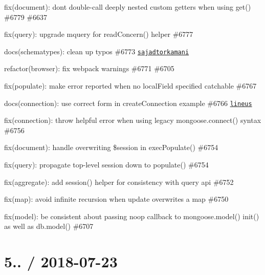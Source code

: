 \begin{DoxyItemize}
\item fix(document)\+: don\textquotesingle{}t double-\/call deeply nested custom getters when using {\ttfamily get()} \#6779 \#6637
\item fix(query)\+: upgrade mquery for read\+Concern() helper \#6777
\item docs(schematypes)\+: clean up typos \#6773 \href{https://github.com/sajadtorkamani}{\tt sajadtorkamani}
\item refactor(browser)\+: fix webpack warnings \#6771 \#6705
\item fix(populate)\+: make error reported when no {\ttfamily local\+Field} specified catchable \#6767
\item docs(connection)\+: use correct form in create\+Connection example \#6766 \href{https://github.com/lineus}{\tt lineus}
\item fix(connection)\+: throw helpful error when using legacy {\ttfamily mongoose.\+connect()} syntax \#6756
\item fix(document)\+: handle overwriting {\ttfamily \$session} in {\ttfamily exec\+Populate()} \#6754
\item fix(query)\+: propagate top-\/level session down to {\ttfamily populate()} \#6754
\item fix(aggregate)\+: add {\ttfamily session()} helper for consistency with query api \#6752
\item fix(map)\+: avoid infinite recursion when update overwrites a map \#6750
\item fix(model)\+: be consistent about passing noop callback to mongoose.\+model() {\ttfamily init()} as well as db.\+model() \#6707
\end{DoxyItemize}

\section*{5.. / 2018-\/07-\/23 }


